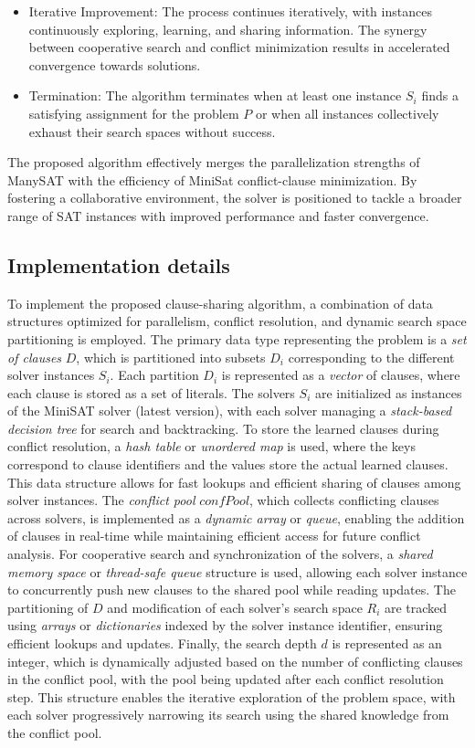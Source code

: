 \documentclass{article}
\begin{document}
\begin{itemize}
    \item Iterative Improvement: The process continues iteratively, with instances continuously exploring, learning, and sharing information. The synergy between cooperative search and conflict minimization results in accelerated convergence towards solutions.

    \item Termination: The algorithm terminates when at least one instance $S_i$ finds a satisfying assignment for the problem $P$ or when all instances collectively exhaust their search spaces without success.
\end{itemize}

The proposed algorithm effectively merges the parallelization strengths of ManySAT with the efficiency of MiniSat conflict-clause minimization. By fostering a collaborative environment, the solver is positioned to tackle a broader range of SAT instances with improved performance and faster convergence.

\subsection{Implementation details}
To implement the proposed clause-sharing algorithm, a combination of data structures optimized for parallelism, conflict resolution, and dynamic search space partitioning is employed. The primary data type representing the problem is a \textit{set of clauses} $D$, which is partitioned into subsets $D_i$ corresponding to the different solver instances $S_i$. Each partition $D_i$ is represented as a \textit{vector} of clauses, where each clause is stored as a set of literals. The solvers $S_i$ are initialized as instances of the MiniSAT solver (latest version), with each solver managing a \textit{stack-based decision tree} for search and backtracking. To store the learned clauses during conflict resolution, a \textit{hash table} or \textit{unordered map} is used, where the keys correspond to clause identifiers and the values store the actual learned clauses. This data structure allows for fast lookups and efficient sharing of clauses among solver instances. The \textit{conflict pool} \( confPool \), which collects conflicting clauses across solvers, is implemented as a \textit{dynamic array} or \textit{queue}, enabling the addition of clauses in real-time while maintaining efficient access for future conflict analysis. For cooperative search and synchronization of the solvers, a \textit{shared memory space} or \textit{thread-safe queue} structure is used, allowing each solver instance to concurrently push new clauses to the shared pool while reading updates. The partitioning of $D$ and modification of each solver’s search space $R_i$ are tracked using \textit{arrays} or \textit{dictionaries} indexed by the solver instance identifier, ensuring efficient lookups and updates. Finally, the search depth $d $ is represented as an integer, which is dynamically adjusted based on the number of conflicting clauses in the conflict pool, with the pool being updated after each conflict resolution step. This structure enables the iterative exploration of the problem space, with each solver progressively narrowing its search using the shared knowledge from the conflict pool.
\end{document}
